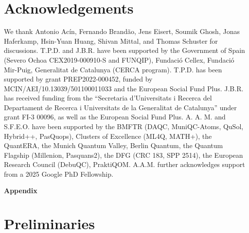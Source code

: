 \documentclass[
    aps,
    superscriptaddress,
    onecolumn,
    10pt,
    prx,
    nofootinbib
]{revtex4-2}
\let\origcontentsline\addcontentsline
\newcommand\resumetoc{\let\addcontentsline\origcontentsline}
\theoremstyle{namedstatement}
\theoremstyle{plain}
\begin{document}
\section{Acknowledgements}
We thank Antonio Acín, Fernando Brandão, Jens Eisert, Soumik Ghosh, Jonas Haferkamp, Hsin-Yuan Huang, Shivan Mittal, and Thomas Schuster for discussions.  
T.P.D. and J.B.R. have been supported by the Government of Spain (Severo Ochoa CEX2019-000910-S and FUNQIP), Fundació Cellex, Fundació Mir-Puig, Generalitat de Catalunya (CERCA program). T.P.D. has been supported by grant PREP2022-000452, funded by MCIN/AEI/10.13039/501100011033 and the European Social Fund Plus. J.B.R. has received funding from the “Secretaria d’Universitats i Recerca del Departament de Recerca i Universitats de la Generalitat de Catalunya” under grant FI-3 00096, as well as the European Social Fund Plus. A. A. M. and S.F.E.O. have been supported by the BMFTR (DAQC, MuniQC-Atoms, QuSol, Hybrid++, PasQuops), Clusters of Excellence (ML4Q, MATH+), the QuantERA, the Munich Quantum Valley, Berlin Quantum, the Quantum Flagship (Millenion, Pasquans2), the DFG (CRC 183, SPP 2514), the European Research Council (DebuQC), PraktiQOM. A.A.M. further acknowledges support from a 2025 Google PhD Fellowship.


\newpage


\appendix 
\resumetoc


\setcounter{secnumdepth}{2}
\setcounter{equation}{0}
\setcounter{figure}{0}
\setcounter{table}{0}
\setcounter{section}{0}
\renewcommand{\thetable}{A\arabic{table}}
\renewcommand{\theequation}{A\arabic{section}.\arabic{equation}}
\renewcommand{\thefigure}{A\arabic{figure}}
\renewcommand{\thesection}{A.\arabic{section}} 
\renewcommand{\thesubsection}{\thesection.\arabic{subsection}}
\renewcommand{\thesubsubsection}{\thesubsection.\arabic{subsubsection}}
\makeatletter
\renewcommand{\p@subsection}{}
\renewcommand{\p@subsubsection}{}
\makeatother
\begin{center}
\textbf{\large Appendix}
\end{center}
\tableofcontents %

\newpage
\section{Preliminaries}\label{app:preliminaries}
\end{document}
